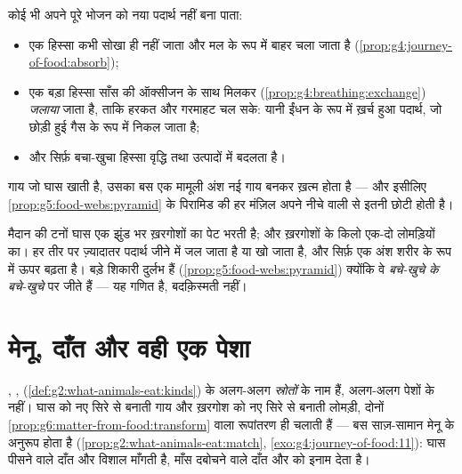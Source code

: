 \begin{proposition}[सारा भोजन शरीर नहीं बनता]\label{prop:g6:matter-from-food:losses}
कोई भी  अपने पूरे भोजन को नया पदार्थ नहीं बना पाता:
\begin{itemize}
  \item एक हिस्सा कभी सोखा ही नहीं जाता और मल के रूप में बाहर चला जाता
        है (\cref{prop:g4:journey-of-food:absorb});
  \item एक बड़ा हिस्सा साँस की ऑक्सीजन के साथ मिलकर
        (\cref{prop:g4:breathing:exchange}) \emph{जलाया} जाता है, ताकि
        हरकत और गरमाहट चल सके: यानी ईंधन के रूप में ख़र्च हुआ पदार्थ,
        जो छोड़ी हुई गैस के रूप में निकल जाता है;
  \item और सिर्फ़ बचा-खुचा हिस्सा वृद्धि तथा उत्पादों में बदलता है।
\end{itemize}
गाय जो घास खाती है, उसका बस एक मामूली अंश नई गाय बनकर ख़त्म होता है ---
और इसीलिए \cref{prop:g5:food-webs:pyramid} के पिरामिड की हर मंज़िल अपने
नीचे वाली से इतनी छोटी होती है।
\end{proposition}
\admitted

\begin{example}[पिरामिड, आख़िरकार समझाया हुआ]\label{ex:g6:matter-from-food:pyramid}
मैदान की टनों घास एक झुंड भर ख़रगोशों का पेट भरती है; और ख़रगोशों के
किलो एक-दो लोमड़ियों का। हर तीर पर ज़्यादातर पदार्थ जीने में जल जाता है
या खो जाता है, और सिर्फ़ एक अंश शरीर के रूप में ऊपर बढ़ता है। बड़े
शिकारी दुर्लभ हैं (\cref{prop:g5:food-webs:pyramid}) क्योंकि वे
\emph{बचे-खुचे के बचे-खुचे} पर जीते हैं --- यह गणित है, बदक़िस्मती
नहीं।
\end{example}

\section{मेनू, दाँत और वही एक पेशा}

\begin{proposition}\label{prop:g6:matter-from-food:menus}
, , 
(\cref{def:g2:what-animals-eat:kinds})  के अलग-अलग
\emph{स्रोतों} के नाम हैं, अलग-अलग पेशों के नहीं। घास को नए सिरे से
बनाती गाय और ख़रगोश को नए सिरे से बनाती लोमड़ी, दोनों
\cref{prop:g6:matter-from-food:transform} वाला रूपांतरण ही चलाती हैं
--- बस साज़-सामान मेनू के अनुरूप होता है
(\cref{prop:g2:what-animals-eat:match},
\cref{exo:g4:journey-of-food:11}): घास पीसने वाले दाँत और विशाल 
माँगती है, माँस दबोचने वाले दाँत और  को इनाम देता है।
\end{proposition}
\admitted

